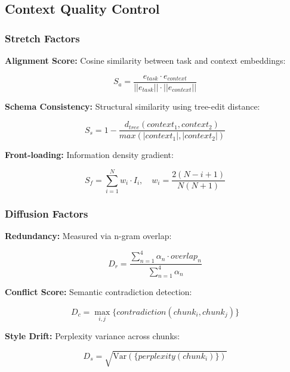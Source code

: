 \documentclass[conference]{IEEEtran}
\begin{document}
\subsection{Context Quality Control}

\subsubsection{Stretch Factors}

\textbf{Alignment Score:} Cosine similarity between task and context embeddings:

\begin{equation}
S_a = \frac{e_{task} \cdot e_{context}}{||e_{task}|| \cdot ||e_{context}||}
\end{equation}

\textbf{Schema Consistency:} Structural similarity using tree-edit distance:

\begin{equation}
S_s = 1 - \frac{d_{tree}(context_1, context_2)}{max(|context_1|, |context_2|)}
\end{equation}

\textbf{Front-loading:} Information density gradient:

\begin{equation}
S_f = \sum_{i=1}^{N} w_i \cdot I_i, \quad w_i = \frac{2(N-i+1)}{N(N+1)}
\end{equation}

\subsubsection{Diffusion Factors}

\textbf{Redundancy:} Measured via n-gram overlap:

\begin{equation}
D_r = \frac{\sum_{n=1}^{4} \alpha_n \cdot overlap_n}{\sum_{n=1}^{4} \alpha_n}
\end{equation}

\textbf{Conflict Score:} Semantic contradiction detection:

\begin{equation}
D_c = \max_{i,j} \{contradiction(chunk_i, chunk_j)\}
\end{equation}

\textbf{Style Drift:} Perplexity variance across chunks:

\begin{equation}
D_s = \sqrt{\text{Var}(\{perplexity(chunk_i)\})}
\end{equation}
\end{document}
